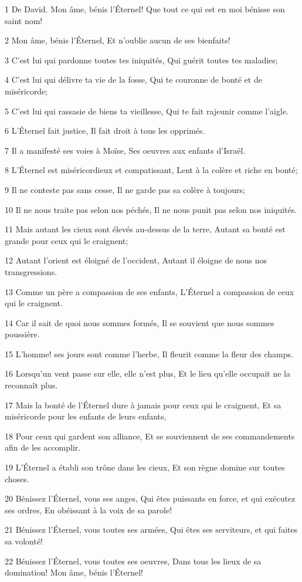 \par 1 De David. Mon âme, bénis l'Éternel! Que tout ce qui est en moi bénisse son saint nom!
\par 2 Mon âme, bénis l'Éternel, Et n'oublie aucun de ses bienfaits!
\par 3 C'est lui qui pardonne toutes tes iniquités, Qui guérit toutes tes maladies;
\par 4 C'est lui qui délivre ta vie de la fosse, Qui te couronne de bonté et de miséricorde;
\par 5 C'est lui qui rassasie de biens ta vieillesse, Qui te fait rajeunir comme l'aigle.
\par 6 L'Éternel fait justice, Il fait droit à tous les opprimés.
\par 7 Il a manifesté ses voies à Moïse, Ses oeuvres aux enfants d'Israël.
\par 8 L'Éternel est miséricordieux et compatissant, Lent à la colère et riche en bonté;
\par 9 Il ne conteste pas sans cesse, Il ne garde pas sa colère à toujours;
\par 10 Il ne nous traite pas selon nos péchés, Il ne nous punit pas selon nos iniquités.
\par 11 Mais autant les cieux sont élevés au-dessus de la terre, Autant sa bonté est grande pour ceux qui le craignent;
\par 12 Autant l'orient est éloigné de l'occident, Autant il éloigne de nous nos transgressions.
\par 13 Comme un père a compassion de ses enfants, L'Éternel a compassion de ceux qui le craignent.
\par 14 Car il sait de quoi nous sommes formés, Il se souvient que nous sommes poussière.
\par 15 L'homme! ses jours sont comme l'herbe, Il fleurit comme la fleur des champs.
\par 16 Lorsqu'un vent passe sur elle, elle n'est plus, Et le lieu qu'elle occupait ne la reconnaît plus.
\par 17 Mais la bonté de l'Éternel dure à jamais pour ceux qui le craignent, Et sa miséricorde pour les enfants de leurs enfants,
\par 18 Pour ceux qui gardent son alliance, Et se souviennent de ses commandements afin de les accomplir.
\par 19 L'Éternel a établi son trône dans les cieux, Et son règne domine sur toutes choses.
\par 20 Bénissez l'Éternel, vous ses anges, Qui êtes puissants en force, et qui exécutez ses ordres, En obéissant à la voix de sa parole!
\par 21 Bénissez l'Éternel, vous toutes ses armées, Qui êtes ses serviteurs, et qui faites sa volonté!
\par 22 Bénissez l'Éternel, vous toutes ses oeuvres, Dans tous les lieux de sa domination! Mon âme, bénis l'Éternel!

